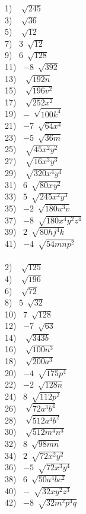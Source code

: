 \begin{multicols}{2}
	1)~ $\sqrt[]{245}$\\
  3)~ $\sqrt[]{36}$\\
  5)~ $\sqrt[]{12}$\\
  7)~ $3~\sqrt[]{12}$\\
  9)~ $6~\sqrt[]{128}$\\
  11)~ $- 8~\sqrt[]{392}$\\
  13)~ $\sqrt[]{192 n}$\\
  15)~ $\sqrt[]{196 v^2}$\\
  17)~ $\sqrt[]{252 x^2}$\\
  19)~ $-~\sqrt[]{100 k^4}$\\
  21)~ $- 7~\sqrt[]{64 x^4}$\\
  23)~ $- 5~\sqrt[]{36 m}$\\
  25)~ $\sqrt[]{45 x^2 y^2}$\\
  27)~ $\sqrt[]{16 x^3 y^3}$\\
  29)~ $\sqrt[]{320 x^4 y^4}$\\
  31)~ $6~\sqrt[]{80 x^{} y^2}$\\
  33)~ $5~\sqrt[]{245 x^2 y^3}$\\
  35)~ $- 2~\sqrt[]{180 u^3 v}$\\
  37)~ $- 8~\sqrt[]{180 x^4 y^2 z^4}$\\
  39)~ $2~\sqrt[]{80 h j^4 k}$\\
  41)~ $- 4~\sqrt[]{54 m n p^2}$\\
  ~\\
	2)~ $\sqrt[]{125}$\\
  4)~ $\sqrt[]{196}$\\
  6)~ $\sqrt[]{72}$\\
  8)~ $5~\sqrt[]{32}$\\
  10)~ $7~\sqrt[]{128}$\\
  12)~ $- 7~\sqrt[]{63}$\\
  14)~ $\sqrt[]{343 b}$\\
  16)~ $\sqrt[]{100 n^3}$\\
  18)~ $\sqrt[]{200 a^3}$\\
  20)~ $- 4~\sqrt[]{175 p^4}$\\
  22)~ $- 2~\sqrt[]{128 n}$\\
  24)~ $8~\sqrt[]{112 p^2}$\\
  26)~ $\sqrt[]{72 a^3 b^4}$\\
  28)~ $\sqrt[]{512 a^4 b^2}$\\
  30)~ $\sqrt[]{512 m^4 n^3}$\\
  32)~ $8~\sqrt[]{98 m n}$\\
  34)~ $2~\sqrt[]{72 x^2 y^2}$\\
  36)~ $- 5~\sqrt[]{72 x^3 y^4}$\\
  38)~ $6~\sqrt[]{50 a^4 b c^2}$\\
  40)~ $-~\sqrt[]{32 x y^2 z^3}$\\
  42)~ $- 8~\sqrt[]{32 m^2 p^4 q}$\\
\end{multicols}

